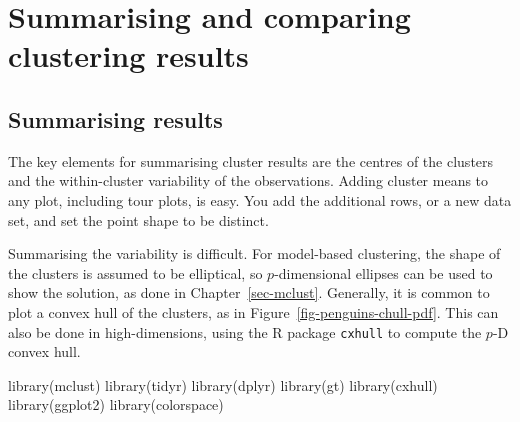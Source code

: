 \documentclass[
  letterpaper,
]{krantz}
\newenvironment{Shaded}{\begin{snugshade}}{\end{snugshade}}
\newcommand{\FunctionTok}[1]{\textcolor[rgb]{0.28,0.35,0.67}{#1}}
\newcommand{\NormalTok}[1]{\textcolor[rgb]{0.00,0.23,0.31}{#1}}
\begin{document}
\chapter{Summarising and comparing clustering
results}\label{sec-clust-compare}


\section{Summarising results}\label{summarising-results}

The key elements for summarising cluster results are the centres of the
clusters and the within-cluster variability of the observations. Adding
cluster means to any plot, including tour plots, is easy. You add the
additional rows, or a new data set, and set the point shape to be
distinct.

Summarising the variability is difficult. For model-based clustering,
the shape of the clusters is assumed to be elliptical, so
\(p\)-dimensional ellipses can be used to show the solution, as done in
Chapter~\ref{sec-mclust}. Generally, it is common to plot a convex hull
of the clusters, as in Figure~\ref{fig-penguins-chull-pdf}. This can
also be done in high-dimensions, using the R package \texttt{cxhull} to
compute the \(p\)-D convex hull.

\begin{Shaded}
\begin{Highlighting}[]
\FunctionTok{library}\NormalTok{(mclust) }
\FunctionTok{library}\NormalTok{(tidyr)}
\FunctionTok{library}\NormalTok{(dplyr)}
\FunctionTok{library}\NormalTok{(gt)}
\FunctionTok{library}\NormalTok{(cxhull)}
\FunctionTok{library}\NormalTok{(ggplot2)}
\FunctionTok{library}\NormalTok{(colorspace)}
\end{Highlighting}
\end{Shaded}
\end{document}
